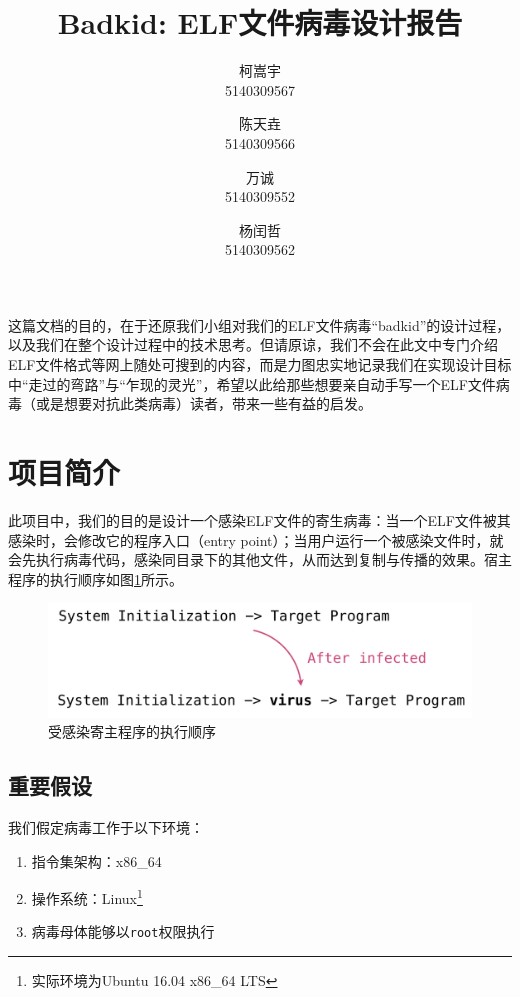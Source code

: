 \documentclass[a4paper, 11pt]{article}
\begin{document}
\title{Badkid: ELF文件病毒设计报告}

\author{柯嵩宇\\ 5140309567 \and 陈天垚 \\ 5140309566 \and 万诚 \\ 5140309552  \and 杨闰哲\\ 5140309562	 \vspace{1em}}
\maketitle

这篇文档的目的，在于还原我们小组对我们的ELF文件病毒“badkid”的设计过程，以及我们在整个设计过程中的技术思考。但请原谅，我们不会在此文中专门介绍ELF文件格式等网上随处可搜到的内容，而是力图忠实地记录我们在实现设计目标中“走过的弯路”与“乍现的灵光”，希望以此给那些想要亲自动手写一个ELF文件病毒（或是想要对抗此类病毒）读者，带来一些有益的启发。

\tableofcontents
\newpage
\section{项目简介}
	此项目中，我们的目的是设计一个感染ELF文件的寄生病毒：当一个ELF文件被其感染时，会修改它的程序入口（entry point）；当用户运行一个被感染文件时，就会先执行病毒代码，感染同目录下的其他文件，从而达到复制与传播的效果。宿主程序的执行顺序如图\ref{fig:order}所示。
	\vspace{1em}
	\begin{figure}[htbp]
		\centering
		\includegraphics[width = \textwidth]{figures/fig3_first}
		\caption{受感染寄主程序的执行顺序}
		\label{fig:order}
	\end{figure}
\subsection{重要假设}	
	我们假定病毒工作于以下环境：
	\begin{enumerate}
		\item 指令集架构：x86\_64
		\item 操作系统：Linux\footnote{实际环境为Ubuntu 16.04 x86\_64 LTS}
		\item 病毒母体能够以\texttt{root}权限执行
	\end{enumerate}
	
\end{document}
